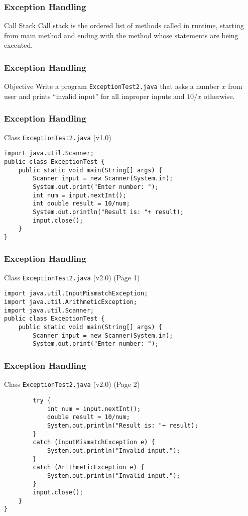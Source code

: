 \documentclass[10pt, compress]{beamer}
\begin{document}
\begin{frame}[fragile]
	\frametitle{Exception Handling}
	\begin{block}{Call Stack}
		Call stack is the ordered list of methods called in runtime, starting from main method and ending with the method whose statements are being executed.
	\end{block}
\end{frame}

\begin{frame}[fragile]
	\frametitle{Exception Handling}
	\begin{block}{Objective}
		Write a program \texttt{ExceptionTest2.java} that asks a number $x$ from user and prints ``invalid input'' for all improper inputs and	$10/x$ otherwise.
	\end{block}
\end{frame}

\begin{frame}[fragile]
	\frametitle{Exception Handling}
	\begin{block}{Class \texttt{ExceptionTest2.java} (v1.0)}
		\begin{verbatim}
import java.util.Scanner;
public class ExceptionTest {
	public static void main(String[] args) {
		Scanner input = new Scanner(System.in);
		System.out.print("Enter number: ");
		int num = input.nextInt();
		int double result = 10/num;
		System.out.println("Result is: "+ result);
		input.close();
	}
}
		\end{verbatim}
	\end{block}
\end{frame}

\begin{frame}[fragile]
	\frametitle{Exception Handling}
	\begin{block}{Class \texttt{ExceptionTest2.java} (v2.0) (Page 1)}
		\begin{verbatim}
import java.util.InputMismatchException;
import java.util.ArithmeticException;
import java.util.Scanner;
public class ExceptionTest {
	public static void main(String[] args) {
		Scanner input = new Scanner(System.in);
		System.out.print("Enter number: ");
		\end{verbatim}
	\end{block}
\end{frame}

\begin{frame}[fragile]
	\frametitle{Exception Handling}
	\begin{block}{Class \texttt{ExceptionTest2.java} (v2.0) (Page 2)}
		\begin{verbatim}
		try {
			int num = input.nextInt();
			double result = 10/num;
			System.out.println("Result is: "+ result);
		}
		catch (InputMismatchException e) {
			System.out.println("Invalid input.");
		}
		catch (ArithmeticException e) {
			System.out.println("Invalid input.");
		}
		input.close();
	}
}
		\end{verbatim}
	\end{block}
\end{frame}
\end{document}
